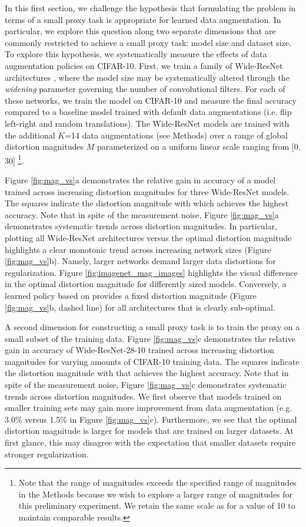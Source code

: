 In this first section, we challenge the hypothesis that formulating the problem in terms of a small proxy task is appropriate for learned data augmentation. In particular, we explore this question along two separate dimensions that are commonly restricted to achieve a small proxy task: model size and dataset size. To explore this hypothesis, we systematically measure the effects of data augmentation policies on CIFAR-10. First, we train a family of  Wide-ResNet architectures \cite{WRN2016}, where the model size may be systematically altered through the {\em widening} parameter governing the number of convolutional filters. For each of these networks, we train the model on CIFAR-10 and measure the final accuracy compared to a baseline model trained with default data augmentations (i.e. flip left-right and random translations). The Wide-ResNet models are trained with the additional $K$=14 data augmentations (see Methods) over a range of global distortion magnitudes $M$ parameterized on a uniform linear scale ranging from [0, 30] \footnote{Note that the range of magnitudes exceeds the specified range of magnitudes in the Methods because we wish to explore a larger range of magnitudes for this preliminary experiment. We retain the same scale as \cite{cubuk2018autoaugment} for a value of 10 to maintain comparable results.}.

Figure \ref{fig:mag_vs}a demonstrates the relative gain in accuracy of a model trained across increasing distortion magnitudes for three Wide-ResNet models. The squares indicate the distortion magnitude with which achieves the highest accuracy. Note that in spite of the measurement noise, Figure \ref{fig:mag_vs}a demonstrates systematic trends across distortion magnitudes. In particular, plotting all Wide-ResNet architectures versus the optimal distortion magnitude highlights a clear monotonic trend across increasing network sizes (Figure \ref{fig:mag_vs}b). Namely, larger networks demand larger data distortions for regularization. Figure \ref{fig:imagenet_mag_images} highlights the visual difference in the optimal distortion magnitude for differently sized models. Conversely, a learned policy based on \cite{cubuk2018autoaugment} provides a fixed distortion magnitude (Figure \ref{fig:mag_vs}b, dashed line) for all architectures that is clearly sub-optimal.

A second dimension for constructing a small proxy task is to train the proxy on a small subset of the training data.
Figure \ref{fig:mag_vs}c demonstrates the relative gain in accuracy of Wide-ResNet-28-10 trained across increasing distortion magnitudes for varying amounts of CIFAR-10 training data.
The squares indicate the distortion magnitude with that achieves the highest accuracy. Note that in spite of the measurement noise, Figure \ref{fig:mag_vs}c demonstrates systematic trends across distortion magnitudes.
We first observe that models trained on smaller training sets may gain more improvement from data augmentation  (e.g. 3.0\% versus 1.5\% in Figure \ref{fig:mag_vs}c). Furthermore, we see that the optimal distortion magnitude is larger for models that are trained on larger datasets. At first glance, this may disagree with the expectation that smaller datasets require stronger regularization.

